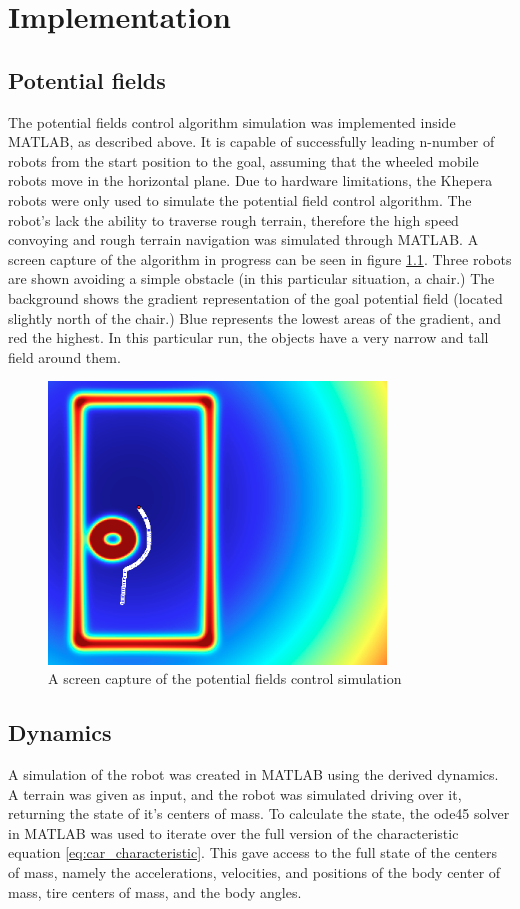 \chapter{Implementation}
\section{Potential fields}
The potential fields control algorithm simulation was implemented inside MATLAB, as described above. It is capable of successfully leading n-number of robots from the start position to the goal, assuming that the wheeled mobile robots move in the horizontal plane. Due to hardware limitations, the Khepera robots were only used to simulate the potential field control algorithm. The robot's lack the ability to traverse rough terrain, therefore the high speed convoying and rough terrain navigation was simulated through MATLAB. A screen capture of the algorithm in progress can be seen in figure \ref{fig:pot_fields_imp}. Three robots are shown avoiding a simple obstacle (in this particular situation, a chair.) The background shows the gradient representation of the goal potential field (located slightly north of the chair.) Blue represents the lowest areas of the gradient, and red the highest. In this particular run, the objects have a very narrow and tall field around them.

\begin{figure}[t]
	\centering
	\includegraphics[width=0.8\textwidth]{figures/pot_fields_imp.png}
	\caption{A screen capture of the potential fields control simulation}
	\label{fig:pot_fields_imp}
\end{figure}

\section{Dynamics}
A simulation of the robot was created in MATLAB using the derived dynamics. A terrain was given as input, and the robot was simulated driving over it, returning the state of it's centers of mass. To calculate the state, the ode45 solver in MATLAB was used to iterate over the full version of the characteristic equation \eqref{eq:car_characteristic}. This gave access to the full state of the centers of mass, namely the accelerations, velocities, and positions of the body center of mass, tire centers of mass, and the body angles.

